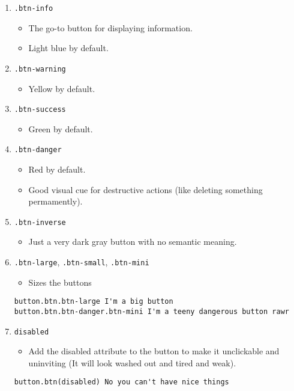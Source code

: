 \documentclass[12pt]{article}
\begin{document}
\begin{enumerate}
\begin{enumerate}
\item \texttt{.btn-info}
\begin{itemize}
\item The go-to button for displaying information.
\item Light blue by default.
\end{itemize}

\item \texttt{.btn-warning}
\begin{itemize}
\item Yellow by default.
\end{itemize}

\item \texttt{.btn-success}
\begin{itemize}
\item Green by default.
\end{itemize}

\item \texttt{.btn-danger}
\begin{itemize}
\item Red by default.
\item Good visual cue for destructive actions (like deleting something permamently).
\end{itemize}

\item \texttt{.btn-inverse}
\begin{itemize}
\item Just a very dark gray button with no semantic meaning.
\end{itemize}

\item \texttt{.btn-large}, \texttt{.btn-small}, \texttt{.btn-mini}
\begin{itemize}
\item Sizes the buttons
\end{itemize}
\begin{lstlisting}[frame=single]
button.btn.btn-large I'm a big button
button.btn.btn-danger.btn-mini I'm a teeny dangerous button rawr
\end{lstlisting}

\item \texttt{disabled}
\begin{itemize}
\item Add the disabled attribute to the button to make it unclickable and uninviting (It will look washed out and tired and weak).
\end{itemize}
\begin{lstlisting}[frame=single]
button.btn(disabled) No you can't have nice things
\end{lstlisting}

\end{enumerate}


\end{enumerate}
\end{document}
